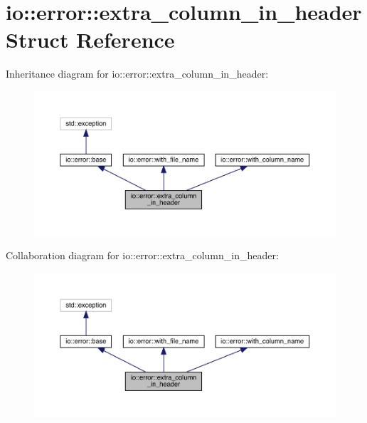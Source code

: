 \hypertarget{structio_1_1error_1_1extra__column__in__header}{}\section{io\+:\+:error\+:\+:extra\+\_\+column\+\_\+in\+\_\+header Struct Reference}
\label{structio_1_1error_1_1extra__column__in__header}


Inheritance diagram for io\+:\+:error\+:\+:extra\+\_\+column\+\_\+in\+\_\+header\+:\nopagebreak
\begin{figure}[H]
\begin{center}
\leavevmode
\includegraphics[width=350pt]{structio_1_1error_1_1extra__column__in__header__inherit__graph}
\end{center}
\end{figure}


Collaboration diagram for io\+:\+:error\+:\+:extra\+\_\+column\+\_\+in\+\_\+header\+:\nopagebreak
\begin{figure}[H]
\begin{center}
\leavevmode
\includegraphics[width=350pt]{structio_1_1error_1_1extra__column__in__header__coll__graph}
\end{center}
\end{figure}
